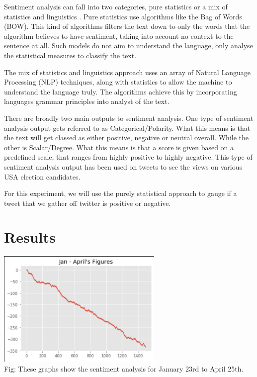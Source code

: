 \documentclass[a4paper,10pt]{article}
\begin{document}
	Sentiment analysis can fall into two categories, pure statistics or a mix of statistics and linguistics \cite{towarddatasciencesentiment}. Pure statistics use algorithms like the Bag of Words (BOW). This kind of algorithms filters the text down to only the words that the algorithm believes to have sentiment, taking into account no context to the sentence at all. Such models do not aim to understand the language, only analyse the statistical measures to classify the text. 
	
	The mix of statistics and linguistics approach uses an array of Natural Language Processing (NLP) techniques, along with statistics to allow the machine to understand the language truly. The algorithms achieve this by incorporating languages grammar principles into analyst of the text. 
	
	There are broadly two main outputs to sentiment analysis. One type of sentiment analysis output gets referred to as Categorical/Polarity. What this means is that the text will get classed as either positive, negative or neutral overall. While the other is Scalar/Degree. What this means is that a score is given based on a predefined scale, that ranges from highly positive to highly negative. This type of sentiment analysis output has been used on tweets to see the views on various USA election candidates.
	
	For this experiment, we will use the purely statistical approach to gauge if a tweet that we gather off twitter is positive or negative.
	
	
	\section{Results}
	
	
	\begin{center}
		\label{confusion_matrix}
		\includegraphics[width=8cm]{allresults2.png}
		\centering
		\\Fig: These graphs show the sentiment analysis for January 23rd to April 25th. 
	\end{center}
\end{document}
